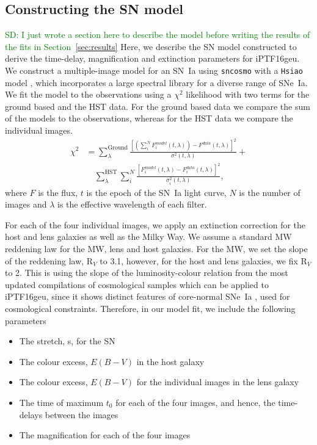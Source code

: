 \documentclass[a4paper,fleqn,usenatbib]{mnras}
\newcommand{\sd}[1]{\textcolor{green}{SD: #1}}
\begin{document}
\subsection{Constructing the SN model}
\sd{I just wrote a section here to describe the model before writing the results of the fits in Section~\ref{sec:results}}
Here, we describe the SN model constructed to derive the time-delay, magnification and extinction parameters for iPTF16geu. We construct a multiple-image model for an SN~Ia using \texttt{sncosmo} with a \texttt{Hsiao} model \citep{2007ApJ...663.1187H}, which incorporates a large spectral library for a diverse range of SNe~Ia. 
  We fit the model to the observations using a $\chi^2$ likelihood with two terms for the ground based and the HST data. For the ground based data we compare the sum of the models to the observations, whereas for the HST data we compare the individual images. 
\begin{equation}
\label{eq:chi}
\begin{aligned}
\chi ^2 &= \sum_{\lambda}^{\mathrm{Ground}}\frac{\left[\left(\sum_i^{N} F_i^{model}(t,\lambda)\right)-F^{data}(t,\lambda)\right]^2}{\sigma^2(t,\lambda)}+ \\
&\quad \sum_{\lambda}^{\mathrm{HST}}\sum_i^{N}\frac{\left[F_i^{model}(t,\lambda)-F_i^{data}(t,\lambda)\right]^2}{\sigma_i^2(t,\lambda)},
\end{aligned}
\end{equation}
where $F$ is the flux, $t$ is the epoch of the SN~Ia light curve, $N$ is the number of images and $\lambda$ is the effective wavelength of each filter. 

For each of the four individual images, we apply an extinction correction for the host and lens galaxies as well as the Milky Way. We assume a standard MW reddening law \citep{1989ApJ...345..245C} for the MW, lens and host galaxies. For the MW, we set the slope of the reddening law, R$_V$ to 3.1, however, for the host and lens galaxies, we fix  R$_V$ to 2. This is using the slope of the luminosity-colour relation from the most updated compilations of cosmological samples \citep[see;][]{2018ApJ...859..101S,2018arXiv181102374D} which can be applied to iPTF16geu, since it shows distinct features of core-normal SNe~Ia \citep[e.g.,][]{2006PASP..118..560B}, used for cosmological constraints. Therefore, in our model fit, we include the following parameters 
\begin{itemize}
    \item The stretch, s, for the SN
    \item The colour excess, $E(B-V)$ in the host galaxy
    \item The colour excess, $E(B-V)$ for the individual images in the lens galaxy 
    \item The time of maximum $t_{0}$ for each of the four images, and hence, the time-delays between the images
    \item The magnification for each of the four images
\end{itemize}
\end{document}
